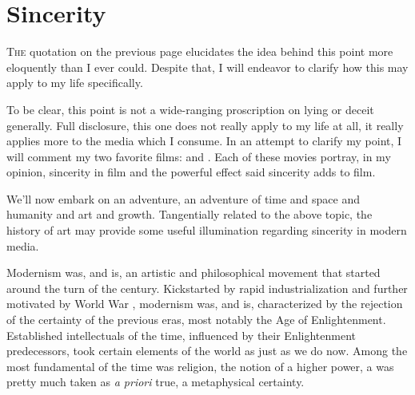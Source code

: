 \documentclass[../butidigress.tex]{subfiles}
\newcounter{worldwarcounter}\setcounter{worldwarcounter}{1}
\begin{document}
\chapter{Sincerity}\label{chap:sincerity}
\newpage

\lettrine{T}{he} quotation on the previous page elucidates the idea behind this point more eloquently than I ever could.
Despite that, I will endeavor to clarify how this may apply to my life specifically.

To be clear, this point is not a wide-ranging proscription on lying or deceit generally.
Full disclosure, this one does not really apply to my life at all, it really applies more to the media which I consume.
In an attempt to clarify my point, I will comment my two favorite films:  and .
Each of these movies portray, in my opinion, sincerity in film and the powerful effect said sincerity adds to film.

\vspace{1em}

We'll now embark on an adventure, an adventure of time and space and humanity and art and growth.
Tangentially related to the above topic, the history of art may provide some useful illumination regarding sincerity in modern media.

Modernism was, and is, an artistic and philosophical movement that started around the turn of the  century.
Kickstarted by rapid industrialization and further motivated by World War , modernism was, and is, characterized by the rejection of the certainty of the previous eras, most notably the Age of Enlightenment.
Established intellectuals of the time, influenced by their Enlightenment predecessors, took certain elements of the world as  just as we do now.
Among the most fundamental of the time was religion, the notion of a higher power, a  was pretty much taken as \textit{a priori} true, a metaphysical certainty.
\end{document}
